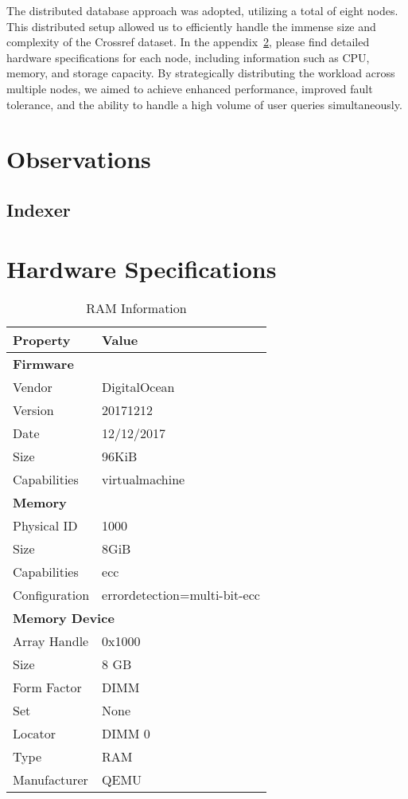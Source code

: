 \documentclass{article}
\begin{document}
The distributed database approach was adopted, utilizing a total of eight nodes. 
This distributed setup allowed us to efficiently handle the immense size and complexity of the 
Crossref dataset. In the appendix~\ref{apx:hardware-specs}, please find detailed hardware 
specifications for each node, including information such as CPU, memory, and storage capacity. 
By strategically distributing the workload across multiple nodes, we aimed to achieve enhanced 
performance, improved fault tolerance, and the ability to handle a high volume of user queries 
simultaneously. 

\section{Observations}

\subsection{Indexer}


\newpage
\appendix
\section{Hardware Specifications}
\label{apx:hardware-specs}
\begin{table}[htbp]
    \centering
    \caption{RAM Information}
    \begin{tabular}{ll}
      \toprule
      \textbf{Property} & \textbf{Value} \\
      \midrule
      \multicolumn{2}{l}{\textbf{Firmware}} \\
      Vendor & DigitalOcean \\
      Version & 20171212 \\
      Date & 12/12/2017 \\
      Size & 96KiB \\
      Capabilities & virtualmachine \\
      \midrule
      \multicolumn{2}{l}{\textbf{Memory}} \\
      Physical ID & 1000 \\
      Size & 8GiB \\
      Capabilities & ecc \\
      Configuration & errordetection=multi-bit-ecc \\
      \midrule
      \multicolumn{2}{l}{\textbf{Memory Device}} \\
      Array Handle & 0x1000 \\
      Size & 8 GB \\
      Form Factor & DIMM \\
      Set & None \\
      Locator & DIMM 0 \\
      Type & RAM \\
      Manufacturer & QEMU \\
      \bottomrule
    \end{tabular}
  \end{table}
\end{document}

